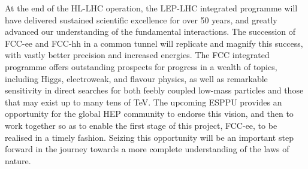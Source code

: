 At the end of the HL-LHC operation, 
the LEP-LHC integrated programme will have delivered sustained scientific excellence for over 50 years, and greatly advanced our understanding of the fundamental interactions.   The succession of FCC-ee and FCC-hh in a common tunnel will replicate and magnify this success, with vastly better precision and increased energies. The FCC integrated programme offers outstanding prospects for progress in a wealth of topics, including Higgs, electroweak, and flavour physics, as well as remarkable sensitivity in direct searches for both feebly coupled low-mass particles and those that may exist up to many tens of TeV. The upcoming ESPPU provides an opportunity for the global HEP community to endorse this vision, and then to work together so as to enable the first stage of this project, FCC-ee, to be realised in a timely fashion. Seizing this opportunity will be an important step forward in the journey towards a more complete understanding of the laws of nature.   
